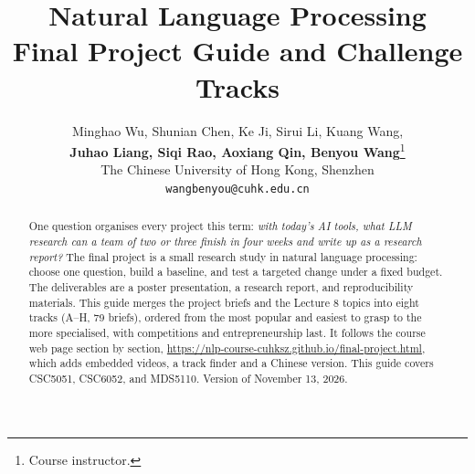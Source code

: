 \documentclass{article}
\title{Natural Language Processing\\Final Project Guide and Challenge Tracks}
\author{Minghao Wu, Shunian Chen, Ke Ji, Sirui Li, Kuang Wang,\\
\textbf{Juhao Liang, Siqi Rao, Aoxiang Qin, Benyou Wang}\thanks{Course instructor.}\\
The Chinese University of Hong Kong, Shenzhen\\
\texttt{wangbenyou@cuhk.edu.cn}}
\begin{document}
\maketitle

\begin{abstract}
One question organises every project this term: \emph{with today's AI tools, what LLM research can a team of two or three finish in four weeks and write up as a research report?} The final project is a small research study in natural language processing: choose one question, build a baseline, and test a targeted change under a fixed budget. The deliverables are a poster presentation, a research report, and reproducibility materials. This guide merges the project briefs and the Lecture 8 topics into eight tracks (A--H, 79 briefs), ordered from the most popular and easiest to grasp to the more specialised, with competitions and entrepreneurship last. It follows the course web page section by section, \url{https://nlp-course-cuhksz.github.io/final-project.html}, which adds embedded videos, a track finder and a Chinese version. This guide covers CSC5051, CSC6052, and MDS5110. Version of November 13, 2026.
\end{abstract}



\begin{ack}

\end{ack}




\clearpage
\appendix


\end{document}
